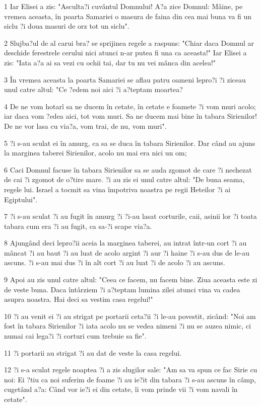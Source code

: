 \par 1 Iar Elisei a zis: "Asculta?i cuvântul Domnului! A?a zice Domnul: Mâine, pe vremea aceasta, în poarta Samariei o masura de faina din cea mai buna va fi un siclu ?i doua masuri de orz tot un siclu".
\par 2 Slujba?ul de al carui bra? se sprijinea regele a raspuns: "Chiar daca Domnul ar deschide ferestrele cerului nici atunci n-ar putea fi una ca aceasta!" Iar Elisei a zis: "Iata a?a ai sa vezi cu ochii tai, dar tu nu vei mânca din acelea!"
\par 3 În vremea aceasta la poarta Samariei se aflau patru oameni lepro?i ?i ziceau unul catre altul: "Ce ?edem noi aici ?i a?teptam moartea?
\par 4 De ne vom hotarî sa ne ducem în cetate, în cetate e foamete ?i vom muri acolo; iar daca vom ?edea aici, tot vom muri. Sa ne ducem mai bine în tabara Sirienilor! De ne vor lasa cu via?a, vom trai, de nu, vom muri".
\par 5 ?i s-au sculat ei în amurg, ca sa se duca în tabara Sirienilor. Dar când au ajuns la marginea taberei Sirienilor, acolo nu mai era nici un om;
\par 6 Caci Domnul facuse în tabara Sirienilor sa se auda zgomot de care ?i nechezat de cai ?i zgomot de o?tire mare. ?i au zis ei unul catre altul: "De buna seama, regele lui. Israel a tocmit sa vina împotriva noastra pe regii Heteilor ?i ai Egiptului".
\par 7 ?i s-au sculat ?i au fugit în amurg ?i ?i-au lasat corturile, caii, asinii lor ?i toata tabara cum era ?i au fugit, ca sa-?i scape via?a.
\par 8 Ajungând deci lepro?ii aceia la marginea taberei, au intrat într-un cort ?i au mâncat ?i au baut ?i au luat de acolo argint ?i aur ?i haine ?i s-au dus de le-au ascuns. ?i s-au mai dus ?i în alt cort ?i au luat ?i de acolo ?i au ascuns.
\par 9 Apoi au zis unul catre altul: "Ceea ce facem, nu facem bine. Ziua aceasta este zi de veste buna. Daca întârziem ?i a?teptam lumina zilei atunci vina va cadea asupra noastra. Hai deci sa vestim casa regelui!"
\par 10 ?i au venit ei ?i au strigat pe portarii ceta?ii ?i le-au povestit, zicând: "Noi am fost în tabara Sirienilor ?i iata acolo nu se vedea nimeni ?i nu se auzea nimic, ci numai cai lega?i ?i corturi cum trebuie sa fie".
\par 11 ?i portarii au strigat ?i au dat de veste la casa regelui.
\par 12 ?i s-a sculat regele noaptea ?i a zis slugilor sale: "Am sa va spun ce fac Sirie cu noi: Ei ?tiu ca noi suferim de foame ?i au ie?it din tabara ?i s-au ascuns în câmp, cugetând a?a: Când vor ie?i ei din cetate, îi vom prinde vii ?i vom navali în cetate".
